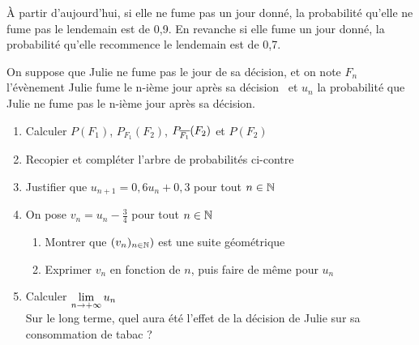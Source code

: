 \documentclass[oneside,12pt]{book}          %
\begin{document}
À partir d'aujourd'hui, si elle ne fume pas un jour donné, la probabilité qu'elle ne fume pas le lendemain est de 0,9. En revanche si elle fume un jour donné, la probabilité qu'elle recommence le lendemain est de 0,7.

On suppose que Julie ne fume pas le jour de sa décision, et on note $F_n$ l'évènement \og Julie fume le n-ième jour après sa décision \fg ~et $u_n$ la probabilité que Julie ne fume pas le n-ième jour après sa décision.


\begin{minipage}{0.6\textwidth}
\begin{enumerate}
    \item Calculer $P(F_1)$, $P_{F_1}(F_2)$, $P_{{\overline{F_1}}}(F_2)$ et $P(F_2)$
    \item Recopier et compléter l'arbre de probabilités ci-contre
    \item Justifier que $u_{n+1}=0,6u_n+0,3$ pour tout ${n\in\mathbb N}$
    \item On pose $v_n=u_n-\frac{3}{4}$ pour tout ${n\in\mathbb N}$
    \begin{enumerate}
        \item Montrer que $(v_n)_{{n\in\mathbb N}})$ est une suite géométrique
        \item Exprimer $v_n$ en fonction de $n$, puis faire de même pour $u_n$
    \end{enumerate}
    \item Calculer ${\lim\limits_{n\to +\infty}}\, u_n$ \\
    Sur le long terme, quel aura été l'effet de la décision de Julie sur sa consommation de tabac ?
\end{enumerate}
\end{minipage}
\begin{minipage}{0.39\textwidth}
\end{minipage}
\end{document}
